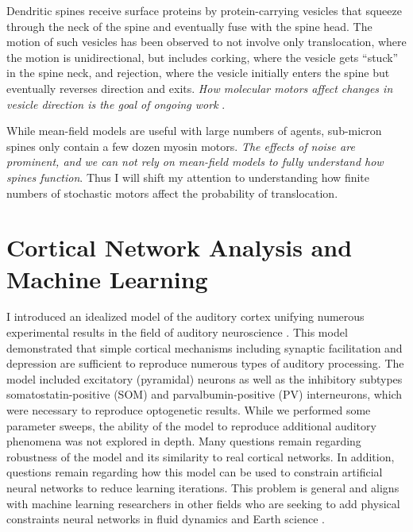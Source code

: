 \documentclass[a4paper,11pt]{article}
\begin{document}
Dendritic spines receive surface proteins by protein-carrying vesicles that squeeze through the neck of the spine and eventually fuse with the spine head. The motion of such vesicles has been observed to not involve only translocation, where the motion is unidirectional, but includes corking, where the vesicle gets ``stuck'' in the spine neck, and rejection, where the vesicle initially enters the spine but eventually reverses direction and exits. \textit{How molecular motors affect changes in vesicle direction is the goal of ongoing work} \cite{park2020dynamics}.

While mean-field models are useful with large numbers of agents, sub-micron spines only contain a few dozen myosin motors. \textit{The effects of noise are prominent, and we can not rely on mean-field models to fully understand how spines function}. Thus I will shift my attention to understanding how finite numbers of stochastic motors affect the probability of translocation.


\section{Cortical Network Analysis and Machine Learning}\label{sec:data}

I introduced an idealized model of the auditory cortex unifying numerous experimental results in the field of auditory neuroscience \cite{park2020circuit}. This model demonstrated that simple cortical mechanisms including synaptic facilitation and depression are sufficient to reproduce numerous types of auditory processing. The model included excitatory (pyramidal) neurons as well as the inhibitory subtypes somatostatin-positive (SOM) and parvalbumin-positive (PV) interneurons, which were necessary to reproduce optogenetic results. While we performed some parameter sweeps, the ability of the model to reproduce additional auditory phenomena was not explored in depth. Many questions remain regarding robustness of the model and its similarity to real cortical networks. In addition, questions remain regarding how this model can be used to constrain artificial neural networks to reduce learning iterations. This problem is general and aligns with machine learning researchers in other fields who are seeking to add physical constraints neural networks in fluid dynamics \cite{mohan2020embedding} and Earth science \cite{pelissier2020combining}.


\end{document}
